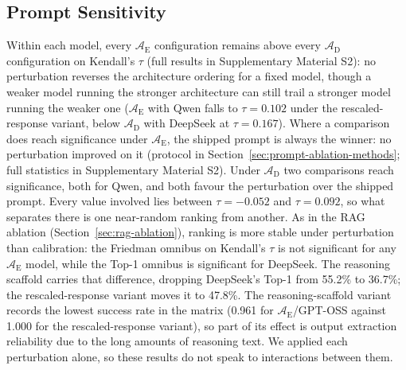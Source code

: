 \documentclass[final,3p,times]{elsarticle}
\begin{document}
\FloatBarrier
\subsection{Prompt Sensitivity}
\label{sec:prompt-ablation}

Within each model, every $\mathcal{A}_{\text{E}}$ configuration remains above every $\mathcal{A}_{\text{D}}$ configuration on Kendall's $\tau$ (full results in Supplementary Material S2): no perturbation reverses the architecture ordering for a fixed model, though a weaker model running the stronger architecture can still trail a stronger model running the weaker one ($\mathcal{A}_{\text{E}}$ with Qwen falls to $\tau = 0.102$ under the rescaled-response variant, below $\mathcal{A}_{\text{D}}$ with DeepSeek at $\tau = 0.167$).
Where a comparison does reach significance under $\mathcal{A}_{\text{E}}$, the shipped prompt is always the winner: no perturbation improved on it (protocol in Section~\ref{sec:prompt-ablation-methods}; full statistics in Supplementary Material S2). Under $\mathcal{A}_{\text{D}}$ two comparisons reach significance, both for Qwen, and both favour the perturbation over the shipped prompt. Every value involved lies between $\tau = -0.052$ and $\tau = 0.092$, so what separates there is one near-random ranking from another. As in the RAG ablation (Section~\ref{sec:rag-ablation}), ranking is more stable under perturbation than calibration: the Friedman omnibus on Kendall's $\tau$ is not significant for any $\mathcal{A}_{\text{E}}$ model, while the Top-1 omnibus is significant for DeepSeek. The reasoning scaffold carries that difference, dropping DeepSeek's Top-1 from 55.2\% to 36.7\%; the rescaled-response variant moves it to 47.8\%. The reasoning-scaffold variant records the lowest success rate in the matrix (0.961 for $\mathcal{A}_{\text{E}}$/GPT-OSS against 1.000 for the rescaled-response variant), so part of its effect is output extraction reliability due to the long amounts of reasoning text. We applied each perturbation alone, so these results do not speak to interactions between them.

\FloatBarrier
\end{document}
